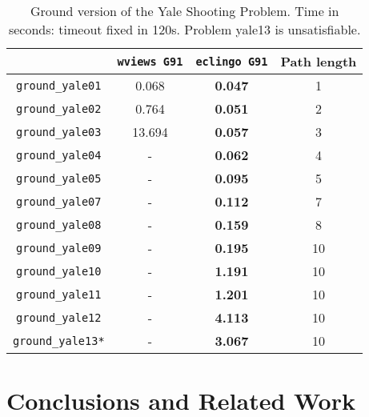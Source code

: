 \documentclass{new_tlp}
\def\eclingo{{\tt eclingo}}
\def\wviews{{\tt \wviews}}
\def\wviews{{\tt wviews}}
\begin{document}

\begin{table}[ht]
    \begin{tabular}{c|cc|c}
        \hline
                       & \texttt{\wviews{} G91} & \texttt{\eclingo{} G91} & Path length \\ \hline
        \texttt{ground\_yale01} & 0.068      & {\bf 0.047}       & 1       \\
        \texttt{ground\_yale02} & 0.764      & {\bf 0.051}       & 2       \\
        \texttt{ground\_yale03} & 13.694     & {\bf 0.057}       & 3       \\
        \texttt{ground\_yale04} & -          & {\bf 0.062}       & 4       \\
        \texttt{ground\_yale05} & -          & {\bf 0.095}       & 5       \\
        \texttt{ground\_yale07} & -          & {\bf 0.112}       & 7       \\
        \texttt{ground\_yale08} & -          & {\bf 0.159}       & 8       \\
        \texttt{ground\_yale09} & -          & {\bf 0.195}       & 10      \\
        \texttt{ground\_yale10} & -          & {\bf 1.191}       & 10      \\
        \texttt{ground\_yale11} & -          & {\bf 1.201}       & 10      \\
        \texttt{ground\_yale12} & -          & {\bf 4.113}       & 10      \\
        \texttt{ground\_yale13*} & -         & {\bf 3.067}      & 10      \\ \hline
        \end{tabular}
\caption{Ground version of the Yale Shooting Problem. Time in seconds: timeout fixed in 120s. Problem yale13 is unsatisfiable.}
\label{tab:ground_yale}
\end{table}

\section{Conclusions and Related Work}
\label{sec:conc}
\end{document}

